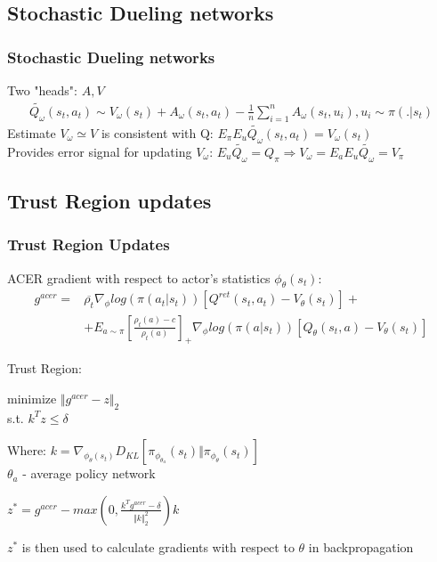 \documentclass{beamer}
\begin{document}
\subsection{Stochastic Dueling networks}
\begin{frame}
\frametitle{Stochastic Dueling networks}
Two "heads": $A, V$
\begin{align*}
\tilde{Q_\omega} (s_t, a_t) \sim V_\omega (s_t) + A_\omega(s_t, a_t) - \frac{1}{n} \sum_{i=1}^n A_\omega (s_t, u_i), u_i \sim \pi(.|s_t)
\end{align*}
Estimate $V_\omega \simeq V$ is consistent with Q: $E_\pi E_u \tilde{Q_\omega} (s_t, a_t) = V_\omega (s_t)$\\
Provides error signal for updating $V_\omega$: $E_u \tilde{Q_\omega} = Q_\pi \Rightarrow V_\omega = E_a E_u \tilde{Q_\omega} = V_\pi$
\end{frame}

\subsection{Trust Region updates}
\begin{frame}
\frametitle{Trust Region Updates}
ACER gradient with respect to actor's statistics $\phi_\theta(s_t)$:\\
\begin{align*}
g^{acer} = & \overline{\rho_t}\nabla_\phi log(\pi(a_t|s_t)) \left[ Q^{ret} (s_t,a_t) - V_\theta(s_t) \right] + \\
			& + E_{a \sim \pi} \left[ \frac{\rho_t(a) - c}{\rho_t(a)} \right]_+ \nabla_\phi log(\pi(a|s_t)) [Q_\theta (s_t, a) - V_\theta (s_t)]
\end{align*}

Trust Region:\\

\begin{center}
minimize $\Vert g^{acer} - z \Vert_2$\\
s.t. $k^T z \leq \delta$
\end{center}
\vspace{3mm}
Where:
$k = \nabla_{\phi_\theta (s_t)} D_{KL} \left[ \pi_{\phi_{\theta_a}} (s_t) \Vert \pi_{\phi_\theta} (s_t) \right]$\\
$\theta_a$ - average policy network

\vspace{3mm}
$z^* = g^{acer} - max \left( 0, \frac{k^T g^{acer} - \delta}{\Vert k \Vert_2^2} \right) k$

$z^*$ is then used to calculate gradients with respect to $\theta$ in backpropagation


\end{frame}
\end{document}

